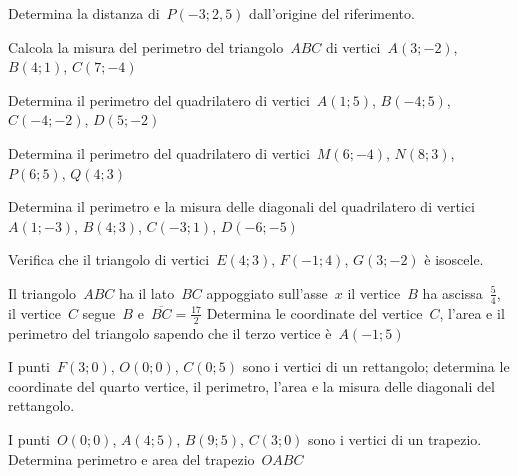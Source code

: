 \begin{esercizio}
Determina la distanza di~\(P\left(-3;2,5\right)\) dall'origine del 
riferimento.
\end{esercizio}

\begin{esercizio}
Calcola la misura del perimetro del triangolo~\(ABC\) di vertici~\(A(3;-2)\), 
\(B(4;1)\), \(C(7;-4)\)
\end{esercizio}

\begin{esercizio}
Determina il perimetro del quadrilatero di vertici~\(A(1;5)\), \(B(-4;5)\), 
\(C(-4;-2)\), \(D(5;-2)\)
\end{esercizio}

\begin{esercizio}
Determina il perimetro del quadrilatero di vertici~\(M(6;-4)\), \(N(8;3)\), 
\(P(6;5)\), \(Q(4;3)\)
\end{esercizio}

\begin{esercizio}
Determina il perimetro e la misura delle diagonali del quadrilatero di 
vertici~\(A(1;-3)\), \(B(4;3)\), \(C(-3;1)\), \(D(-6;-5)\)
\end{esercizio}

\begin{esercizio}
Verifica che il triangolo di vertici~\(E(4;3)\), \(F(-1;4)\), \(G(3;-2)\) è 
isoscele.
\end{esercizio}

\begin{esercizio}
Il triangolo~\(ABC\) ha il lato~\(BC\) appoggiato sull'asse~\(x\) il 
vertice~\(B\) ha ascissa~\(\frac{5}{4}\),
il vertice~\(C\) segue~\(B\) e~\(\overline{BC}=\frac{17}{2}\) Determina le 
coordinate del vertice~\(C\),
l'area e il perimetro del triangolo sapendo che il terzo vertice è~\(A(-1;5)\)
\end{esercizio}

\begin{esercizio}
I punti~\(F(3;0)\), \(O(0;0)\), \(C(0;5)\) sono i vertici di un rettangolo; 
determina le coordinate del quarto vertice, il perimetro,
l'area e la misura delle diagonali del rettangolo.
\end{esercizio}

\begin{esercizio}
I punti~\(O(0;0)\), \(A(4;5)\), \(B(9;5)\), \(C(3;0)\) sono i vertici di un 
trapezio.
Determina perimetro e area del trapezio~\(OABC\)
\end{esercizio}

